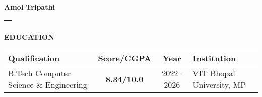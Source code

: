\documentclass[10pt]{article}
\makeatletter
\newcommand{\sectionheader}[1]{%
  \vspace{6pt}%
  \noindent\colorbox{sectiongray}{%
    \parbox[c][10pt]{\dimexpr\textwidth-2\fboxsep}{%
      \vspace*{\fill}%
      {\fontsize{10}{12}\selectfont\bfseries\MakeUppercase{#1}}%
      \vspace*{\fill}%
    }%
  }%
  \vspace{6pt}%
}
\newcommand{\nameblock}[2]{%
  \begin{center}
    {\fontsize{25}{20}\selectfont\bfseries #1}
  \end{center}
  \vspace{-3pt}
  \noindent
  \begin{tabularx}{\textwidth}{@{}X@{}}
    \centering{\fontsize{9}{10}\selectfont #2} \\
  \end{tabularx}
  \vspace{-12pt}
}
\newcommand{\workentry}[4]{%
  \begin{tabularx}{\textwidth}{@{}X r@{}}
    {\fontsize{10}{12}\selectfont\bfseries #1} \quad{\fontsize{8}{11}\selectfont\itshape #2} & {\fontsize{8.5}{11}\selectfont\itshape #3} \\
  \end{tabularx}
  \vspace{-9.5pt}
  #4
  \vspace{5pt}
}
\makeatother
\begin{document}
\nameblock{Amol Tripathi}{%
  \faPhone\ +91-8874955991 \quad
  \faEnvelope\ \href{mailto:amoltripathi28@gmail.com}{amoltripathi28@gmail.com} \quad
  \faLinkedin\ \href{https://www.linkedin.com/in/amol-tri12/}{amol-trip12} \quad
  \faGithub\ \href{https://github.com/amoltrip28}{amoltrip28}
}

\sectionheader{Education}

\begin{tabularx}{\textwidth}{@{} X c c X @{}}
  \toprule
  \textbf{Qualification} & \textbf{Score/CGPA} & \textbf{Year} & \textbf{Institution} \\
  \midrule
  B.Tech Computer Science \& Engineering & \textbf{8.34/10.0} & 2022--2026 & VIT Bhopal University, MP \\
  \bottomrule
\end{tabularx}


  


  
\end{document}
